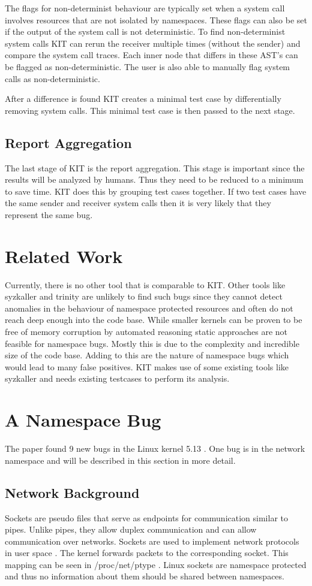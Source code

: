 \documentclass[10pt,twocolumn,a4paper]{article}
\begin{document}
The flags for non-determinist behaviour are typically set when a system call involves resources that are not isolated by namespaces.
These flags  can also be set if the output of the system call is not deterministic. 
To find non-determinist system calls KIT can rerun the receiver multiple times (without the sender) and compare the system call traces.
Each inner node that differs in these AST's can be flagged as non-deterministic.
The user is also able to manually flag system calls as non-deterministic\cite{0}.

After a difference is found KIT creates a minimal test case by differentially removing system calls.
This minimal test case is then passed to the next stage\cite{0}.
\subsection{Report Aggregation}
The last stage of KIT is the report aggregation. This stage is important since the results will be
analyzed by humans.
Thus they need to be reduced to a minimum to save time.
KIT does this by grouping test cases together.
If two test cases have the same sender and receiver system calls then it is very likely that they represent the same bug\cite{0}. 

\section{Related Work}
Currently, there is no other tool that is comparable to  KIT. Other tools like syzkaller\cite{4} and trinity\cite{5} are
unlikely to find such bugs since they cannot detect anomalies in the behaviour of
namespace protected resources and often do not reach deep enough into the code base.
While smaller kernels can be proven to be free of memory corruption by automated reasoning static approaches are not feasible for namespace bugs.\cite{30} 
Mostly this is due to the complexity and incredible size of the code base. Adding to this are the nature of namespace bugs 
which would lead to many false positives.
KIT makes use of some existing tools like syzkaller and needs existing testcases to
perform its analysis\cite{0}\cite{2}.
\section{A Namespace Bug}\label{sec:bug}
The paper found 9 new bugs in the Linux kernel 5.13 \cite{0}. One bug is in the network namespace
and will be described in this section in more detail. 
\subsection{Network Background}
Sockets are pseudo files that serve as endpoints for communication similar to pipes. Unlike pipes,
they allow duplex communication and can allow communication over networks\cite{5}. Sockets are
used to implement network protocols in user space \cite{5}. The kernel forwards packets to the
corresponding socket. This mapping can be seen in /proc/net/ptype \cite{6}. Linux sockets are
namespace protected and thus no information about them should be shared between namespaces.
\end{document}
